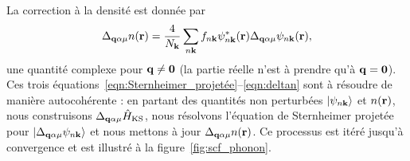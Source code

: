 La correction à la densité est donnée par
\begin{equation}
    \Delta_{\mathbf{q}\alpha\mu} n(\mathbf{r}) = \frac{4}{N_{\mathbf{k}}}\sum_{n\mathbf{k}}f_{n\mathbf{k}}\psi^*_{n\mathbf{k}}(\mathbf{r})\Delta_{\mathbf{q}\alpha\mu}\psi_{n\mathbf{k}}(\mathbf{r}),
    \label{eqn:deltan}
\end{equation}
une quantité complexe pour $\mathbf{q}\neq\mathbf{0}$ (la partie réelle n'est à prendre qu'à $\mathbf{q}=\mathbf{0}$). Ces trois équations~\eqref{eqn:Sternheimer_projetée}--\eqref{eqn:deltan} sont à résoudre de manière autocohérente : en partant des quantités non perturbées $\ket{\psi_{n\mathbf{k}}}$ et $n(\mathbf{r})$, nous construisons $\Delta_{\mathbf{q}\alpha\mu}\hat{H}_\text{KS}$, nous résolvons l'équation de Sternheimer projetée pour $\ket{\Delta_{\mathbf{q}\alpha\mu}\psi_{n\mathbf{k}}}$ et nous mettons à jour $\Delta_{\mathbf{q}\alpha\mu}n(\mathbf{r})$. Ce processus est itéré jusqu'à convergence et est illustré à la figure~\ref{fig:scf_phonon}.

